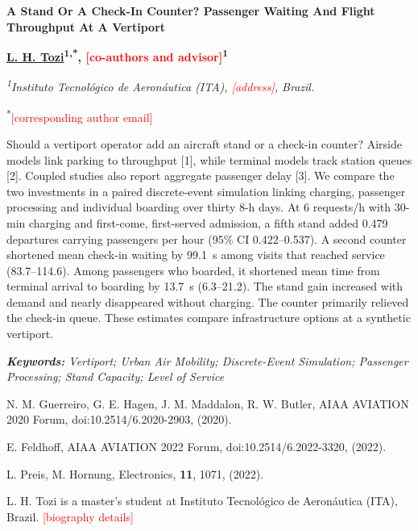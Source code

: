 \documentclass[12pt,a4paper]{article}
\newcommand{\pendente}[1]{\textcolor{red}{[#1]}}
\newcommand{\secao}[1]{\par\noindent{\fontsize{14}{24.15}\selectfont\bfseries #1}\par}
\begin{document}
\begin{center}
{\fontsize{14}{24.15}\selectfont\bfseries
A Stand Or A Check-In Counter? Passenger Waiting And Flight Throughput At A Vertiport\par}
\medskip
{\fontsize{12}{20.7}\selectfont\bfseries
\uline{L. H. Tozi}\textsuperscript{1,*}, \pendente{co-authors and advisor}\textsuperscript{1}\par}
{\fontsize{11}{18.98}\selectfont\itshape
\textsuperscript{1}Instituto Tecnológico de Aeronáutica (ITA), \pendente{address}, Brazil.\par
\textsuperscript{*}\pendente{corresponding author email}\par}
\end{center}

\secao{Abstract}
\fontsize{12}{20.7}\selectfont
Should a vertiport operator add an aircraft stand or a check-in counter? Airside models link parking to throughput [1], while terminal models track station queues [2]. Coupled studies also report aggregate passenger delay [3]. We compare the two investments in a paired discrete-event simulation linking charging, passenger processing and individual boarding over thirty 8-h days. At 6 requests/h with 30-min charging and first-come, first-served admission, a fifth stand added 0.479 departures carrying passengers per hour (95\% CI 0.422--0.537). A second counter shortened mean check-in waiting by 99.1~s among visits that reached service (83.7--114.6). Among passengers who boarded, it shortened mean time from terminal arrival to boarding by 13.7~s (6.3--21.2). The stand gain increased with demand and nearly disappeared without charging. The counter primarily relieved the check-in queue. These estimates compare infrastructure options at a synthetic vertiport.

{\fontsize{12}{20.7}\selectfont\itshape
\textbf{Keywords:} Vertiport; Urban Air Mobility; Discrete-Event Simulation; Passenger Processing;
Stand Capacity; Level of Service\par}

\secao{References}
{\fontsize{12}{20.7}\selectfont
\begin{enumerate}[label={[\arabic*]},leftmargin=*,itemsep=0pt]
\item N. M. Guerreiro, G. E. Hagen, J. M. Maddalon, R. W. Butler, AIAA AVIATION 2020 Forum,
      doi:10.2514/6.2020-2903, (2020).
\item E. Feldhoff, AIAA AVIATION 2022 Forum, doi:10.2514/6.2022-3320, (2022).
\item L. Preis, M. Hornung, Electronics, \textbf{11}, 1071, (2022).
\end{enumerate}}

\secao{Biography}
{\fontsize{12}{20.7}\selectfont
L. H. Tozi is a master's student at Instituto Tecnológico de Aeronáutica (ITA), Brazil.
\pendente{biography details}\par}
\end{document}
